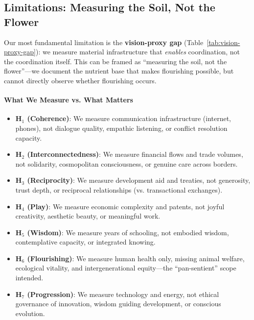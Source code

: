 \documentclass[11pt]{article}
\begin{document}
\subsection{Limitations: Measuring the Soil, Not the Flower}
\label{sec:limitations}

Our most fundamental limitation is the \textbf{vision-proxy gap}
(Table~\ref{tab:vision-proxy-gap}): we measure material infrastructure that
\textit{enables} coordination, not the coordination itself. This can be framed
as ``measuring the soil, not the flower''---we document the nutrient base that
makes flourishing possible, but cannot directly observe whether flourishing
occurs.

\paragraph{What We Measure vs. What Matters}

\begin{itemize}
\item \textbf{H$_1$ (Coherence)}: We measure communication infrastructure
(internet, phones), not dialogue quality, empathic listening, or conflict
resolution capacity.

\item \textbf{H$_2$ (Interconnectedness)}: We measure financial flows and trade
volumes, not solidarity, cosmopolitan consciousness, or genuine care across
borders.

\item \textbf{H$_3$ (Reciprocity)}: We measure development aid and treaties, not
generosity, trust depth, or reciprocal relationships (vs. transactional
exchanges).

\item \textbf{H$_4$ (Play)}: We measure economic complexity and patents, not
joyful creativity, aesthetic beauty, or meaningful work.

\item \textbf{H$_5$ (Wisdom)}: We measure years of schooling, not embodied
wisdom, contemplative capacity, or integrated knowing.

\item \textbf{H$_6$ (Flourishing)}: We measure human health only, missing animal
welfare, ecological vitality, and intergenerational equity---the ``pan-sentient''
scope intended.

\item \textbf{H$_7$ (Progression)}: We measure technology and energy, not
ethical governance of innovation, wisdom guiding development, or conscious
evolution.
\end{itemize}
\end{document}
